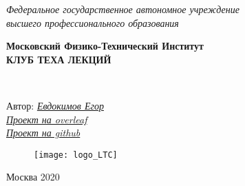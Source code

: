 \begin{titlepage}
	\clearpage\thispagestyle{empty}
	\centering
	
	\textit{Федеральное государственное автономное учреждение \\
		высшего профессионального образования}
	\vspace{0.5ex}
	
	\textbf{Московский Физико-Технический Институт \\ КЛУБ ТЕХА ЛЕКЦИЙ}
	\vspace{20ex}
	\vspace{13ex}
	
	\\
	
	\vspace{1ex}
	Автор: \href{https://vk.com/ea_evdokimov}{\textit{Евдокимов Егор}}
	\\
	\href{https://www.overleaf.com/read/fypgwfhfjbpw}{\textit{Проект на overleaf}}
	\\
	\href{https://github.com/MIPT-Group/Lectures_Tex_Club/tree/master/guides/elementary}{\textit{Проект на github}}
	
	\begin{figure}[!ht]
		\centering
		\texttt{[image: logo\_LTC]}
		\label{fig:my_label}
	\end{figure}

	\vfill
	Москва 2020 
	\pagebreak
	
\end{titlepage}
